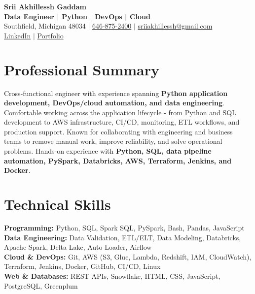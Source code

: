 \documentclass[letterpaper,10pt]{article}
\begin{document}
\fontsize{9.35pt}{10.45pt}\selectfont

\begin{center}
    {\LARGE \textbf{Srii Akhillessh Gaddam}} \\[-1pt]
    \textbf{Data Engineer | Python | DevOps | Cloud} \\[2pt]
    Southfield, Michigan 48034 $|$
    \href{tel:6468752400}{646-875-2400} $|$
    \href{mailto:sriiakhillessh@gmail.com}{sriiakhillessh@gmail.com} \\[1pt]
    \href{https://www.linkedin.com/in/srii-akhiilessh-gaddam-b48668191/}{LinkedIn} $|$
    \href{https://sriiakhillesshg.github.io/portfolio/}{Portfolio}
\end{center}
\vspace{-8pt}

\section{Professional Summary}
\small{Cross-functional engineer with experience spanning \textbf{Python application development, DevOps/cloud automation, and data engineering}. Comfortable working across the application lifecycle - from Python and SQL development to AWS infrastructure, CI/CD, monitoring, ETL workflows, and production support. Known for collaborating with engineering and business teams to remove manual work, improve reliability, and solve operational problems. Hands-on experience with \textbf{Python, SQL, data pipeline automation, PySpark, Databricks, AWS, Terraform, Jenkins, and Docker}.}

\section{Technical Skills}
\small{
\textbf{Programming:} Python, SQL, Spark SQL, PySpark, Bash, Pandas, JavaScript \\
\textbf{Data Engineering:} Data Validation, ETL/ELT, Data Modeling, Databricks, Apache Spark, Delta Lake, Auto Loader, Airflow \\
\textbf{Cloud \& DevOps:} Git, AWS (S3, Glue, Lambda, Redshift, IAM, CloudWatch), Terraform, Jenkins, Docker, GitHub, CI/CD, Linux \\
\textbf{Web \& Databases:} REST APIs, Snowflake, HTML, CSS, JavaScript, PostgreSQL, Greenplum
}

\end{document}
